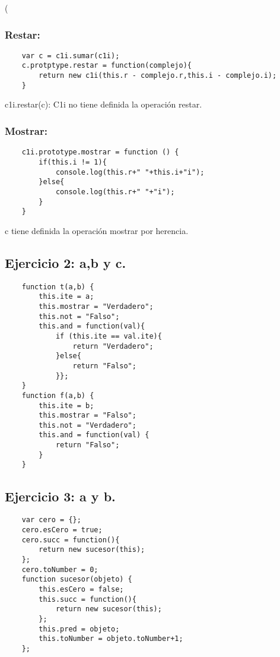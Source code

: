 \left( \documentclass[10pt,a4paper]{article}
\begin{document}
\subsubsection{Restar:}
    \begin{lstlisting}
    var c = c1i.sumar(c1i);
    c.protptype.restar = function(complejo){
    	return new c1i(this.r - complejo.r,this.i - complejo.i);	
    }
    \end{lstlisting}
    c1i.restar(c): C1i no tiene definida la operación restar.
\subsubsection{Mostrar:}
    \begin{lstlisting}
    c1i.prototype.mostrar = function () {
    	if(this.i != 1){
    		console.log(this.r+" "+this.i+"i");
    	}else{
    		console.log(this.r+" "+"i");
    	}
    }
    \end{lstlisting}
    c tiene definida la operación mostrar por herencia.
\subsection{Ejercicio 2: a,b y c.}
    \begin{lstlisting}
    function t(a,b) {
    	this.ite = a;
    	this.mostrar = "Verdadero";
    	this.not = "Falso";
    	this.and = function(val){ 
    		if (this.ite == val.ite){
    			return "Verdadero";	
    		}else{
    			return "Falso";
    		}};
    }
    function f(a,b) {
    	this.ite = b;
    	this.mostrar = "Falso";
    	this.not = "Verdadero";
    	this.and = function(val) {
    		return "Falso";
    	}
    }
    \end{lstlisting}
\subsection{Ejercicio 3: a y b.}
    \begin{lstlisting}
    var cero = {};
    cero.esCero = true;
    cero.succ = function(){ 
    	return new sucesor(this);
    };
    cero.toNumber = 0;
    function sucesor(objeto) {
    	this.esCero = false;
    	this.succ = function(){ 
    		return new sucesor(this);
    	};
    	this.pred = objeto;
    	this.toNumber = objeto.toNumber+1;
    };
    \end{lstlisting}
\end{document}
